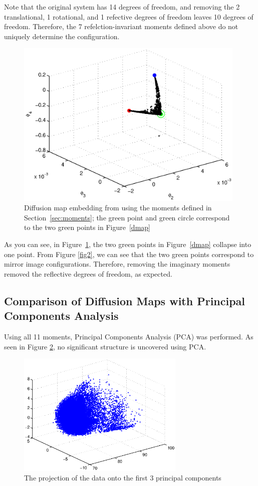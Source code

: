Note that the original system has 14 degrees of freedom, and removing the 2 translational, 1 rotational, and 1 refective degrees of freedom leaves 10 degrees of freedom. Therefore, the 7 refelction-invariant moments defined above do not uniquely determine the configuration. 

\begin{figure}[t]
\includegraphics[width=11cm]{dmap_noreflec.eps}
\caption[Diffusion maps embedding of Lennard-Jones cluster using rotation-invariant moments]{Diffusion map embedding from using the moments defined in Section~\ref{sec:moments}; the green point and green circle correspond to the two green points in Figure~\ref{dmap}}
\label{dmap_noreflec}
\end{figure}

As you can see, in Figure~\ref{dmap_noreflec}, the two green points in Figure~\ref{dmap} collapse into one point. From Figure \ref{fig2}, we can see that the two green points correspond to mirror image configurations. Therefore, removing the imaginary moments removed the reflective degrees of freedom, as expected. 

\subsection{Comparison of Diffusion Maps with Principal Components Analysis}
Using all 11 moments, Principal Components Analysis (PCA) was performed. As seen in Figure \ref{PCA}, no significant structure is uncovered using PCA.
\begin{figure}[t]
\includegraphics[width=8cm]{PCA.eps}
\caption[Principal components embedding of Lennard-Jones cluster]{The projection of the data onto the first 3 principal components}
\label{PCA}
\end{figure}

